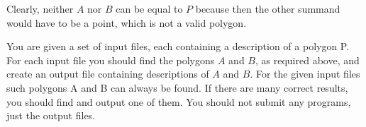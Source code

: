Clearly, neither $A$ nor $B$ can be equal to $P$ because then the other summand would have to be a point, which is not a valid polygon. 

You are given a set of input files, each containing a description of a polygon P. For each input file you should find the polygons $A$ and $B$, as required above, and create an output file containing descriptions of $A$ and $B$. For the given input files such polygons A and B can always be found. If there are many correct results, you should find and output one of them. You should not submit any programs, just the output files. 
